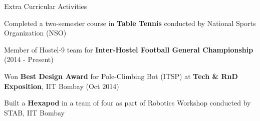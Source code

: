\documentclass{resume} %
\begin{document}
\begin{rSection}{Extra Curricular Activities}
\begin{rSubsection}{}{}{}{}
\vspace{-1 mm}
\item Completed a two-semester course in \textbf{Table Tennis} conducted by  National Sports Organization (NSO)
\item Member of Hostel-9 team for \textbf{Inter-Hostel Football General Championship} (2014 - Present)
\item Won \textbf{Best Design Award} for Pole-Climbing Bot (ITSP) at \textbf{Tech \& RnD Exposition}, IIT Bombay (Oct 2014)
\item Built a \textbf{Hexapod} in a team of four as part of Robotics Workshop conducted by STAB, IIT Bombay
\end{rSubsection}
\end{rSection}
\end{document}
